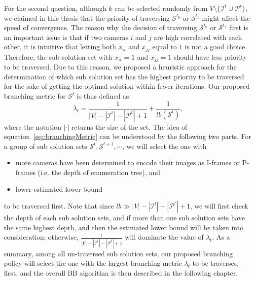 For the second question, although $k$ can be selected randomly from $ V \setminus \{\mathcal{I}^t \cup \mathcal{P}^t\}$, we claimed in this thesis that the priority of traversing $\mathcal{S}^{t_0}$ or $\mathcal{S}^{t_1}$ might affect the speed of convergence.
The reason why the decision of traversing $\mathcal{S}^{t_0}$ or $\mathcal{S}^{t_1}$ first is an important issue is that if two cameras $i$ and $j$ are high correlated with each other, it is intuitive that letting both $x_{ii}$ and $x_{jj}$ equal to $1$ is not a good choice.
%
Therefore, the sub solution set with $x_{ii}=1$ and $x_{jj}=1$ should have less priority to be traversed.
Due to this reason, we proposed a heuristic approach for the determination of which sub solution set has the highest priority to be traversed for the sake of getting the optimal solution within fewer iterations.
Our proposed branching metric for $\mathcal{S}^t$ is thus defined as:
\begin{equation}
\lambda_t = \frac{1}{|V|-|\mathcal{I}^t|-|\mathcal{P}^t|+1}+\frac{1}{lb(\mathcal{S}^t)},
\label{eq::branchingMetric}
\end{equation}
where the notation $|\cdot|$ returns the size of the set.
The idea of equation~\eqref{eq::branchingMetric} can be understood by the following two parts.
For a group of sub solution sets $\mathcal{S}^t, \mathcal{S}^{t+1}, \cdots$, we will select the one with
\begin{itemize}
\item more cameras have been determined to encode their images as I-frames or P-frames (i.e. the depth of enumeration tree), and
\item  lower estimated lower bound
\end{itemize}
to be traversed first.
Note that since $lb \gg |V|-|\mathcal{I}^t|-|\mathcal{P}^t|+1$, we will first check the depth of each sub solution sets, and if more than one sub solution sets have the same highest depth, and then the estimated lower bound will be taken into consideration; otherwise, $\frac{1}{|V|-|\mathcal{I}^t|-|\mathcal{P}^t|+1}$ will dominate the value of $\lambda_t$.
As a summary, among all un-traversed sub solution sets, our proposed branching policy will select the one with the largest branching metric $\lambda_t$ to be traversed first, and the overall BB algorithm is then described in the following chapter.
%

